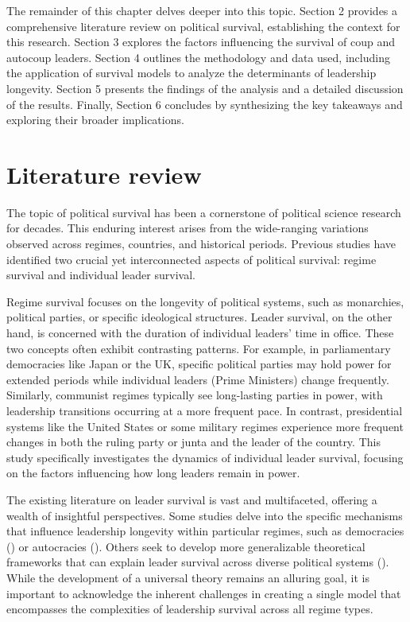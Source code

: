 \documentclass[
  12pt,
]{report}
\begin{document}
The remainder of this chapter delves deeper into this topic. Section 2
provides a comprehensive literature review on political survival,
establishing the context for this research. Section 3 explores the
factors influencing the survival of coup and autocoup leaders. Section 4
outlines the methodology and data used, including the application of
survival models to analyze the determinants of leadership longevity.
Section 5 presents the findings of the analysis and a detailed
discussion of the results. Finally, Section 6 concludes by synthesizing
the key takeaways and exploring their broader implications.

\section{Literature review}\label{literature-review}

The topic of political survival has been a cornerstone of political
science research for decades. This enduring interest arises from the
wide-ranging variations observed across regimes, countries, and
historical periods. Previous studies have identified two crucial yet
interconnected aspects of political survival: regime survival and
individual leader survival.

Regime survival focuses on the longevity of political systems, such as
monarchies, political parties, or specific ideological structures.
Leader survival, on the other hand, is concerned with the duration of
individual leaders' time in office. These two concepts often exhibit
contrasting patterns. For example, in parliamentary democracies like
Japan or the UK, specific political parties may hold power for extended
periods while individual leaders (Prime Ministers) change frequently.
Similarly, communist regimes typically see long-lasting parties in
power, with leadership transitions occurring at a more frequent pace. In
contrast, presidential systems like the United States or some military
regimes experience more frequent changes in both the ruling party or
junta and the leader of the country. This study specifically
investigates the dynamics of individual leader survival, focusing on the
factors influencing how long leaders remain in power.

The existing literature on leader survival is vast and multifaceted,
offering a wealth of insightful perspectives. Some studies delve into
the specific mechanisms that influence leadership longevity within
particular regimes, such as democracies
() or autocracies
(). Others seek to develop more generalizable theoretical frameworks
that can explain leader survival across diverse political systems
().
While the development of a universal theory remains an alluring goal, it
is important to acknowledge the inherent challenges in creating a single
model that encompasses the complexities of leadership survival across
all regime types.
\end{document}

